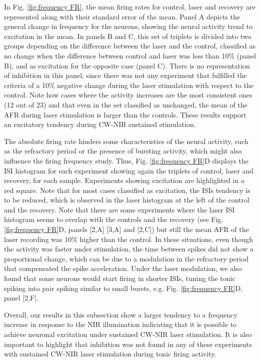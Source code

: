 In Fig. \ref{fig:frequency FR}, the mean firing rates for control, laser and recovery are represented along with their standard error of the mean. Panel A depicts the general change in frequency for the neurons, showing the neural activity trend to excitation in the mean. In panels B and C, this set of triplets is divided into two groups depending on the difference between the laser and the control, classified as no change when the difference between control and laser was less than 10\% (panel B), and as excitation for the opposite case (panel C). There is no representation of inhibition in this panel, since there was not any experiment that fulfilled the criteria of a 10\% negative change during the laser stimulation with respect to the control. Note how cases where the activity increases are the most consistent ones (12 out of 23) and that even in the set classified as unchanged, the mean of the AFR during laser stimulation is larger than the controls. These results support an excitatory tendency during CW-NIR sustained stimulation.

The absolute firing rate hinders some characteristics of the neural activity, such as the refractory period or the presence of bursting activity, which might also influence the firing frequency study. Thus, Fig. \ref{fig:frequency FR}D displays the ISI histogram for each experiment showing again the triplets of control, laser and recovery, for each sample. Experiments showing excitation are highlighted in a red square. Note that for most cases classified as excitation, the ISIs tendency is to be reduced, which is observed in the laser histogram at the left of the control and the recovery. Note that there are some experiments where the laser ISI histogram seems to overlap with the controls and the recovery (see Fig. \ref{fig:frequency FR}D, panels [2,A] [3,A] and [2,C]) but still the mean AFR of the laser recording was 10\% higher than the control. In these situations, even though the activity was faster under stimulation, the time between spikes did not show a proportional change, which can be due to a modulation in the refractory period that compensated the spike acceleration. Under the laser modulation, we also found that some neurons would start firing in shorter ISIs, tuning the tonic spiking into pair spiking similar to small bursts, e.g. Fig. \ref{fig:frequency FR}D, panel [2,F].

Overall, our results in this subsection show a larger tendency to a frequency increase in response to the NIR illumination indicating that it is possible to achieve neuronal excitation under sustained CW-NIR laser stimulation. It is also important to highlight that inhibition was not found in any of these experiments with sustained CW-NIR laser stimulation during tonic firing activity. 


